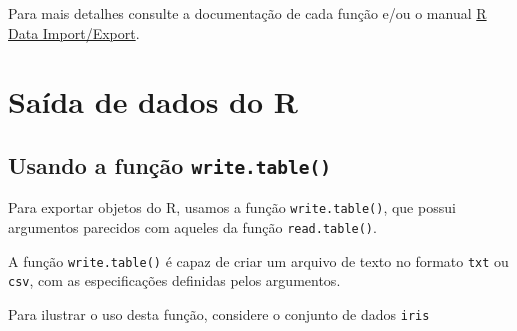 \documentclass[
  10pt,
  a4paper]{book}
\newenvironment{Shaded}{\begin{snugshade}}{\end{snugshade}}
\newcommand{\DecValTok}[1]{\textcolor[rgb]{0.00,0.00,0.81}{#1}}
\newcommand{\ErrorTok}[1]{\textcolor[rgb]{0.64,0.00,0.00}{\textbf{#1}}}
\newcommand{\FloatTok}[1]{\textcolor[rgb]{0.00,0.00,0.81}{#1}}
\newcommand{\FunctionTok}[1]{\textcolor[rgb]{0.00,0.00,0.00}{#1}}
\newcommand{\NormalTok}[1]{#1}
\newcommand{\SpecialCharTok}[1]{\textcolor[rgb]{0.00,0.00,0.00}{#1}}
\newcommand{\StringTok}[1]{\textcolor[rgb]{0.31,0.60,0.02}{#1}}
\begin{document}
Para mais detalhes consulte a documentação de cada função e/ou o manual
\href{http://cran-r.c3sl.ufpr.br/doc/manuals/r-release/R-data.html}{R Data Import/Export}.

\hypertarget{sauxedda-de-dados-do-r}{%
\section{Saída de dados do R}\label{sauxedda-de-dados-do-r}}

\hypertarget{usando-a-funuxe7uxe3o-write.table}{%
\subsection{\texorpdfstring{Usando a função \texttt{write.table()}}{Usando a função write.table()}}\label{usando-a-funuxe7uxe3o-write.table}}

Para exportar objetos do R, usamos a função \texttt{write.table()}, que possui
argumentos parecidos com aqueles da função \texttt{read.table()}.

A função \texttt{write.table()} é capaz de criar um arquivo de texto no formato
\texttt{txt} ou \texttt{csv}, com as especificações definidas pelos argumentos.

Para ilustrar o uso desta função, considere o conjunto de dados \texttt{iris}

\begin{Shaded}
\end{Shaded}
\end{document}
